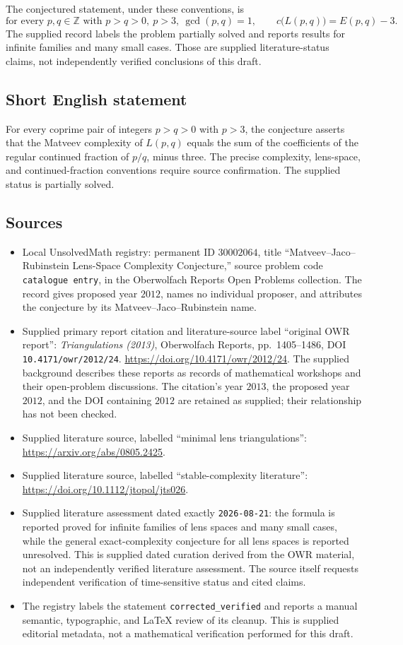 \documentclass[11pt]{article}
\newcommand{\Z}{\mathbb{Z}}
\begin{document}
The conjectured statement, under these conventions, is
\[
 \text{for every }p,q\in\Z\text{ with }p>q>0,\ p>3,\ \gcd(p,q)=1,
 \qquad c\bigl(L(p,q)\bigr)=E(p,q)-3.
\]
The supplied record labels the problem partially solved and reports results for infinite families and many small cases. Those are supplied literature-status claims, not independently verified conclusions of this draft.
\subsection{Short English statement}
For every coprime pair of integers \(p>q>0\) with \(p>3\), the conjecture asserts that the Matveev complexity of \(L(p,q)\) equals the sum of the coefficients of the regular continued fraction of \(p/q\), minus three. The precise complexity, lens-space, and continued-fraction conventions require source confirmation. The supplied status is partially solved.
\subsection{Sources}
\begin{itemize}
\item Local UnsolvedMath registry: permanent ID \(30002064\), title ``Matveev--Jaco--Rubinstein Lens-Space Complexity Conjecture,'' source problem code \texttt{catalogue entry}, in the Oberwolfach Reports Open Problems collection. The record gives proposed year \(2012\), names no individual proposer, and attributes the conjecture by its Matveev--Jaco--Rubinstein name.
\item Supplied primary report citation and literature-source label ``original OWR report'': \emph{Triangulations (2013)}, Oberwolfach Reports, pp.\ 1405--1486, DOI \texttt{10.4171/owr/2012/24}. \url{https://doi.org/10.4171/owr/2012/24}. The supplied background describes these reports as records of mathematical workshops and their open-problem discussions. The citation's year \(2013\), the proposed year \(2012\), and the DOI containing \(2012\) are retained as supplied; their relationship has not been checked.
\item Supplied literature source, labelled ``minimal lens triangulations'': \url{https://arxiv.org/abs/0805.2425}.
\item Supplied literature source, labelled ``stable-complexity literature'': \url{https://doi.org/10.1112/jtopol/jts026}.
\item Supplied literature assessment dated exactly \texttt{2026-08-21}: the formula is reported proved for infinite families of lens spaces and many small cases, while the general exact-complexity conjecture for all lens spaces is reported unresolved. This is supplied dated curation derived from the OWR material, not an independently verified literature assessment. The source itself requests independent verification of time-sensitive status and cited claims.
\item The registry labels the statement \texttt{corrected\_verified} and reports a manual semantic, typographic, and LaTeX review of its cleanup. This is supplied editorial metadata, not a mathematical verification performed for this draft.
\end{itemize}
\end{document}
